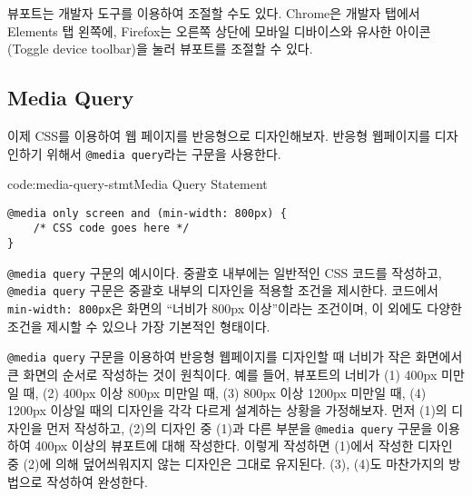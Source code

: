 뷰포트는 개발자 도구를 이용하여 조절할 수도 있다. Chrome은 개발자 탭에서 Elements 탭 왼쪽에, Firefox는 오른쪽 상단에 모바일 디바이스와 유사한 아이콘(Toggle device toolbar)을 눌러 뷰포트를 조절할 수 있다.

\subsection*{Media Query}
이제 CSS를 이용하여 웹 페이지를 반응형으로 디자인해보자. 반응형 웹페이지를 디자인하기 위해서 \texttt{@media query}라는 구문을 사용한다.

\begin{codeenv}{code:media-query-stmt}{Media Query Statement}\begin{verbatim}
@media only screen and (min-width: 800px) {
    /* CSS code goes here */
}
\end{verbatim}
\end{codeenv}

\는 \texttt{@media query} 구문의 예시이다. 중괄호 내부에는 일반적인 CSS 코드를 작성하고, \texttt{@media query} 구문은 중괄호 내부의 디자인을 적용할 조건을 제시한다. 코드에서 \texttt{min-width: 800px}은 화면의 ``너비가 800px 이상''이라는 조건이며, 이 외에도 다양한 조건을 제시할 수 있으나 \가 가장 기본적인 형태이다.

\texttt{@media query} 구문을 이용하여 반응형 웹페이지를 디자인할 때 너비가 작은 화면에서 큰 화면의 순서로 작성하는 것이 원칙이다. 예를 들어, 뷰포트의 너비가 (1) 400px 미만일 때, (2) 400px 이상 800px 미만일 때, (3) 800px 이상 1200px 미만일 때, (4) 1200px 이상일 때의 디자인을 각각 다르게 설계하는 상황을 가정해보자. 먼저 (1)의 디자인을 먼저 작성하고, (2)의 디자인 중 (1)과 다른 부분을 \texttt{@media query} 구문을 이용하여 400px 이상의 뷰포트에 대해 작성한다. 이렇게 작성하면 (1)에서 작성한 디자인 중 (2)에 의해 덮어씌워지지 않는 디자인은 그대로 유지된다. (3), (4)도 마찬가지의 방법으로 작성하여 완성한다.

